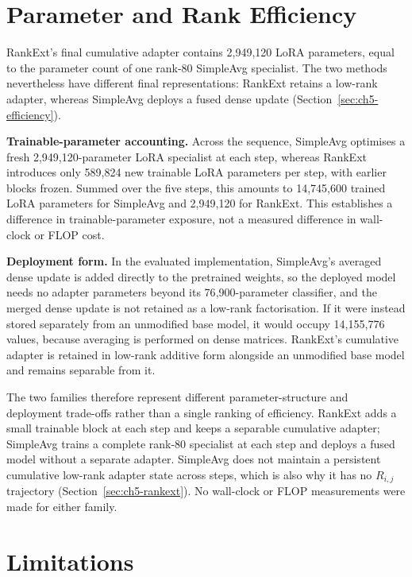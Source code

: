 \section{Parameter and Rank Efficiency}
\label{sec:ch6-efficiency}

RankExt's final cumulative adapter contains 2{,}949{,}120 LoRA parameters,
equal to the parameter count of one rank-80 SimpleAvg specialist. The two
methods nevertheless have different final representations: RankExt retains
a low-rank adapter, whereas SimpleAvg deploys a fused dense update
(Section~\ref{sec:ch5-efficiency}).

\textbf{Trainable-parameter accounting.} Across the sequence, SimpleAvg
optimises a fresh 2{,}949{,}120-parameter LoRA specialist at each step,
whereas RankExt introduces only 589{,}824 new trainable LoRA parameters per
step, with earlier blocks frozen. Summed over the five steps, this amounts
to 14{,}745{,}600 trained LoRA parameters for SimpleAvg and 2{,}949{,}120 for
RankExt. This establishes a difference in trainable-parameter exposure, not
a measured difference in wall-clock or FLOP cost.

\textbf{Deployment form.} In the evaluated implementation, SimpleAvg's
averaged dense update is added directly to the pretrained weights, so the
deployed model needs no adapter parameters beyond its 76{,}900-parameter
classifier, and the merged dense update is not retained as a low-rank
factorisation. If it were instead stored separately from an unmodified
base model, it would occupy 14{,}155{,}776 values, because averaging is
performed on dense matrices. RankExt's cumulative adapter is retained in
low-rank additive form alongside an unmodified base model and remains
separable from it.

The two families therefore represent different parameter-structure and
deployment trade-offs rather than a single ranking of efficiency. RankExt
adds a small trainable block at each step and keeps a separable cumulative
adapter; SimpleAvg trains a complete rank-80 specialist at each step and
deploys a fused model without a separate adapter. SimpleAvg does not
maintain a persistent cumulative low-rank adapter state across steps, which
is also why it has no $R_{i,j}$ trajectory (Section~\ref{sec:ch5-rankext}).
No wall-clock or FLOP measurements were made for either family.

\section{Limitations}
\label{sec:ch6-limitations}

